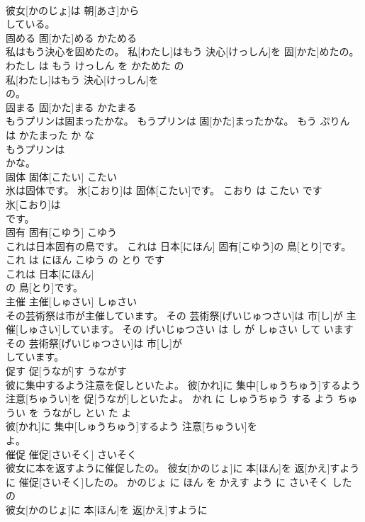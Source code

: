 \documentclass[8pt]{extreport}
\begin{document}
\begin{CJK}{UTF8}{min}
\\	彼女[かのじょ]は 朝[あさ]から
\\	している。			
\\	固める	固[かた]める	かためる	
\\	私はもう決心を固めたの。	私[わたし]はもう 決心[けっしん]を 固[かた]めたの。	わたし は もう けっしん を かためた の	
\\	私[わたし]はもう 決心[けっしん]を
\\	の。			
\\	固まる	固[かた]まる	かたまる	
\\	もうプリンは固まったかな。	もうプリンは 固[かた]まったかな。	もう ぷりん は かたまった か な	
\\	もうプリンは
\\	かな。			
\\	固体	固体[こたい]	こたい	
\\	氷は固体です。	氷[こおり]は 固体[こたい]です。	こおり は こたい です	
\\	氷[こおり]は
\\	です。			
\\	固有	固有[こゆう]	こゆう	
\\	これは日本固有の鳥です。	これは 日本[にほん] 固有[こゆう]の 鳥[とり]です。	これ は にほん こゆう の とり です	
\\	これは 日本[にほん]
\\	の 鳥[とり]です。			
\\	主催	主催[しゅさい]	しゅさい	
\\	その芸術祭は市が主催しています。	その 芸術祭[げいじゅつさい]は 市[し]が 主催[しゅさい]しています。	その げいじゅつさい は し が しゅさい して います	
\\	その 芸術祭[げいじゅつさい]は 市[し]が
\\	しています。			
\\	促す	促[うなが]す	うながす	
\\	彼に集中するよう注意を促しといたよ。	彼[かれ]に 集中[しゅうちゅう]するよう 注意[ちゅうい]を 促[うなが]しといたよ。	かれ に しゅうちゅう する よう ちゅうい を うながし とい た よ	
\\	彼[かれ]に 集中[しゅうちゅう]するよう 注意[ちゅうい]を
\\	よ。			
\\	催促	催促[さいそく]	さいそく	
\\	彼女に本を返すように催促したの。	彼女[かのじょ]に 本[ほん]を 返[かえ]すように 催促[さいそく]したの。	かのじょ に ほん を かえす よう に さいそく した の	
\\	彼女[かのじょ]に 本[ほん]を 返[かえ]すように

\end{CJK}
\end{document}
